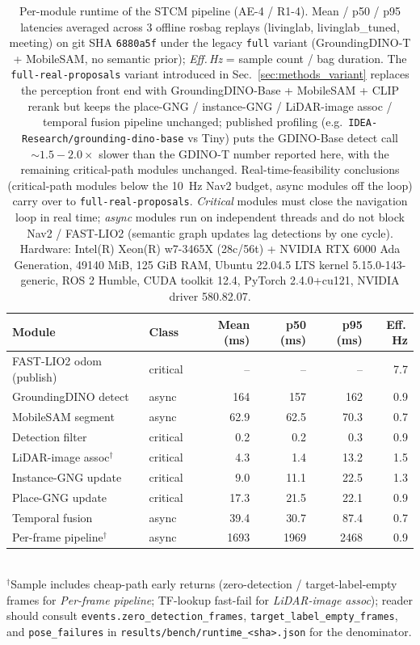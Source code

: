 \begin{table}[t]
\centering
\caption{Per-module runtime of the STCM pipeline (AE-4 / R1-4). Mean / p50 / p95 latencies averaged across 3 offline rosbag replays (livinglab, livinglab_tuned, meeting) on git SHA \texttt{6880a5f} under the legacy \texttt{full} variant (GroundingDINO-T + MobileSAM, no semantic prior); \emph{Eff.\,Hz} = sample count / bag duration. The \texttt{full-real-proposals} variant introduced in Sec.~\ref{sec:methods_variant} replaces the perception front end with GroundingDINO-Base + MobileSAM + CLIP rerank but keeps the place-GNG / instance-GNG / LiDAR-image assoc / temporal fusion pipeline unchanged; published profiling (e.g.\ \texttt{IDEA-Research/grounding-dino-base} vs Tiny) puts the GDINO-Base detect call $\sim 1.5{-}2.0\times$ slower than the GDINO-T number reported here, with the remaining critical-path modules unchanged. Real-time-feasibility conclusions (critical-path modules below the 10~Hz Nav2 budget, async modules off the loop) carry over to \texttt{full-real-proposals}. \emph{Critical} modules must close the navigation loop in real time; \emph{async} modules run on independent threads and do not block Nav2 / FAST-LIO2 (semantic graph updates lag detections by one cycle). Hardware: Intel(R) Xeon(R) w7-3465X (28c/56t) + NVIDIA RTX 6000 Ada Generation, 49140 MiB, 125 GiB RAM, Ubuntu 22.04.5 LTS kernel 5.15.0-143-generic, ROS 2 Humble, CUDA toolkit 12.4, PyTorch 2.4.0+cu121, NVIDIA driver 580.82.07.}
\label{tab:runtime}
\begin{tabular}{l l r r r r}
\toprule
Module & Class & Mean (ms) & p50 (ms) & p95 (ms) & Eff.\,Hz \\
\midrule
FAST-LIO2 odom (publish) & critical & -- & -- & -- & 7.7 \\
GroundingDINO detect & async & 164 & 157 & 162 & 0.9 \\
MobileSAM segment & async & 62.9 & 62.5 & 70.3 & 0.7 \\
Detection filter & critical & 0.2 & 0.2 & 0.3 & 0.9 \\
LiDAR-image assoc$^{\dagger}$ & critical & 4.3 & 1.4 & 13.2 & 1.5 \\
Instance-GNG update & critical & 9.0 & 11.1 & 22.5 & 1.3 \\
Place-GNG update & critical & 17.3 & 21.5 & 22.1 & 0.9 \\
Temporal fusion & async & 39.4 & 30.7 & 87.4 & 0.7 \\
Per-frame pipeline$^{\dagger}$ & async & 1693 & 1969 & 2468 & 0.9 \\
\bottomrule
\end{tabular}
\\[2pt]
\footnotesize $^{\dagger}$Sample includes cheap-path early returns (zero-detection / target-label-empty frames for \emph{Per-frame pipeline}; TF-lookup fast-fail for \emph{LiDAR-image assoc}); reader should consult \texttt{events.zero\_detection\_frames}, \texttt{target\_label\_empty\_frames}, and \texttt{pose\_failures} in \texttt{results/bench/runtime\_<sha>.json} for the denominator.
\end{table}
